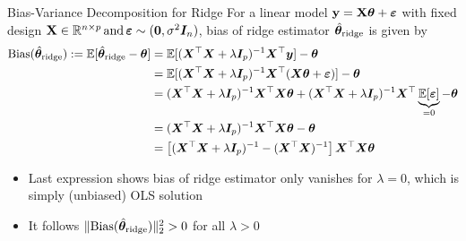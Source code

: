 \documentclass[11pt,compress,t,notes=noshow, xcolor=table]{beamer}
\begin{document}
\begin{vbframe}{Bias-Variance Decomposition for Ridge}
For a linear model $\mathbf{y} = \mathbf{X} \bm{\theta} + \bm{\varepsilon}$ with fixed design $\mathbf{X} \in \mathbb{R}^{n \times p}\,\text{and}\,\bm{\varepsilon} \sim (\bm{0},\sigma^2 \bm{I}_n)$, bias of ridge estimator $\hat{\bm{\theta}}_{\text{ridge}}$ is given by 
\begin{equation*}
    \begin{aligned}
        \text{Bias}(\hat{\bm{\theta}}_{\text{ridge}}) := \mathbb{E}[\hat{\bm{\theta}}_{\text{ridge}}-\bm{\theta}] &= \mathbb{E}[(\bm{X}^{\top}\bm{X} +\lambda\bm{I}_p )^{-1} \bm{X}^{\top}\bm{y}] - \bm{\theta}\\
        &= \mathbb{E}[(\bm{X}^{\top}\bm{X} +\lambda\bm{I}_p )^{-1} \bm{X}^{\top}(\bm{X}\bm{\theta}+\bm{\varepsilon})] - \bm{\theta} \\
        &= (\bm{X}^{\top}\bm{X} +\lambda\bm{I}_p )^{-1} \bm{X}^{\top} \bm{X} \bm{\theta} + (\bm{X}^{\top}\bm{X} +\lambda\bm{I}_p )^{-1} \bm{X}^{\top} \underbrace{\mathbb{E}[\bm{\varepsilon}]}_{=0} - \bm{\theta} \\
        &= (\bm{X}^{\top}\bm{X} +\lambda\bm{I}_p )^{-1} \bm{X}^{\top} \bm{X} \bm{\theta} - \bm{\theta} \\
        &= \left[(\bm{X}^{\top}\bm{X} +\lambda\bm{I}_p )^{-1} - (\bm{X}^{\top} \bm{X})^{-1} \right] \bm{X}^{\top} \bm{X} \bm{\theta}
        \end{aligned}
    \end{equation*}

\begin{itemize}
    \item Last expression shows bias of ridge estimator only vanishes for $\lambda=0$, which is simply (unbiased) OLS solution
    \item It follows $\Vert \text{Bias}(\hat{\bm{\theta}}_{\text{ridge}})\Vert_2^2>0$ for all $\lambda>0$
\end{itemize}


\end{vbframe}
\end{document}
